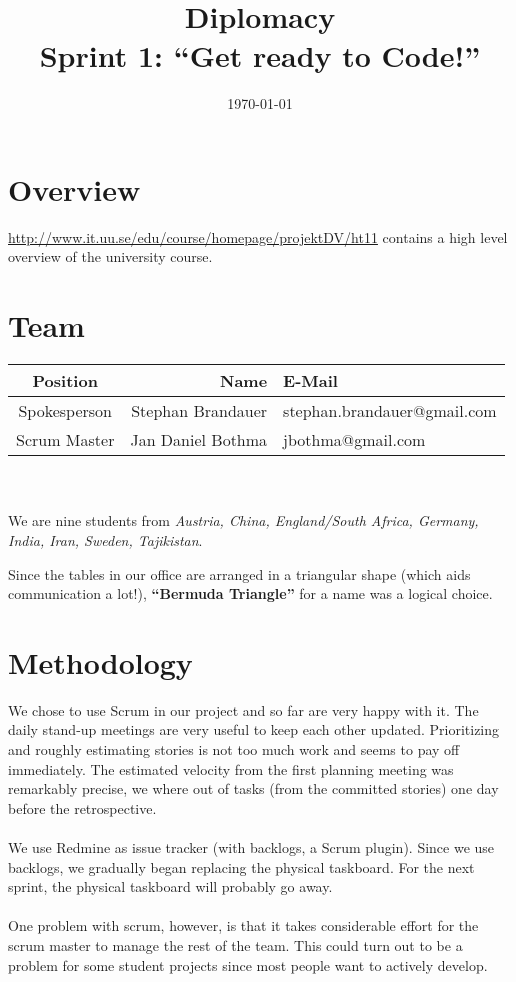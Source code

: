 \documentclass[11pt,a4paper]{article}
\begin{document}
\title{Diplomacy \\
  Sprint 1: ``Get ready to Code!''}
\date{\today}
\author{}
\maketitle

\section{Overview}
\url{http://www.it.uu.se/edu/course/homepage/projektDV/ht11} contains a high level overview of the university course.

\section{Team}
\begin{tabular}{c|rl}
Position     & Name              & E-Mail \\
\hline
Spokesperson & Stephan Brandauer & stephan.brandauer@gmail.com \\
Scrum Master & Jan Daniel Bothma & jbothma@gmail.com
\end{tabular}
\\
\\
We are nine students from {\em Austria, China, England/South Africa, Germany, India, Iran, Sweden, Tajikistan}.

Since the tables in our office are arranged in a triangular shape (which aids communication a lot!),
{\bf ``Bermuda Triangle''} for a name was a logical choice.

\section{Methodology}
We chose to use Scrum in our project and so far are very happy with it.
The daily stand-up meetings are very useful to keep each other updated.
Prioritizing and roughly estimating stories is not too much work and seems to pay off immediately.
The estimated velocity from the first planning meeting was remarkably precise, we where out of tasks
(from the committed stories) one day before the retrospective.
\\
\\
We use Redmine as issue tracker (with backlogs, a Scrum plugin). Since we use backlogs,
we gradually began replacing the physical taskboard. For the next sprint,
the physical taskboard will probably go away.
\\
\\
One problem with scrum, however, is that it takes considerable effort for the scrum master to manage the rest of the team.
This could turn out to be a problem for some student projects since most people want to actively develop.
\end{document}
